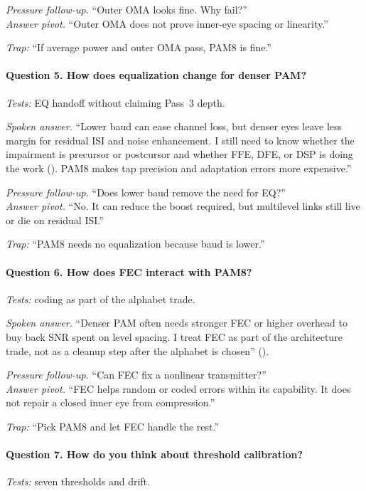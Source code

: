 \textit{Pressure follow-up.} ``Outer OMA looks fine. Why fail?''\\
\textit{Answer pivot.} ``Outer OMA does not prove inner-eye spacing or
linearity.''

\textit{Trap:} ``If average power and outer OMA pass, PAM8 is fine.''

\paragraph{Question 5. How does equalization change for denser PAM?}
\textit{Tests:} EQ handoff without claiming Pass~3 depth.

\textit{Spoken answer.}
``Lower baud can ease channel loss, but denser eyes leave less margin for
residual ISI and noise enhancement. I still need to know whether the impairment
is precursor or postcursor and whether FFE, DFE, or DSP is doing the work
(). PAM8 makes tap precision and adaptation errors more
expensive.''

\textit{Pressure follow-up.} ``Does lower baud remove the need for EQ?''\\
\textit{Answer pivot.} ``No. It can reduce the boost required, but multilevel
links still live or die on residual ISI.''

\textit{Trap:} ``PAM8 needs no equalization because baud is lower.''

\paragraph{Question 6. How does FEC interact with PAM8?}
\textit{Tests:} coding as part of the alphabet trade.

\textit{Spoken answer.}
``Denser PAM often needs stronger FEC or higher overhead to buy back SNR spent
on level spacing. I treat FEC as part of the architecture trade, not as a
cleanup step after the alphabet is chosen'' ().

\textit{Pressure follow-up.} ``Can FEC fix a nonlinear transmitter?''\\
\textit{Answer pivot.} ``FEC helps random or coded errors within its capability.
It does not repair a closed inner eye from compression.''

\textit{Trap:} ``Pick PAM8 and let FEC handle the rest.''

\paragraph{Question 7. How do you think about threshold calibration?}
\textit{Tests:} seven thresholds and drift.

